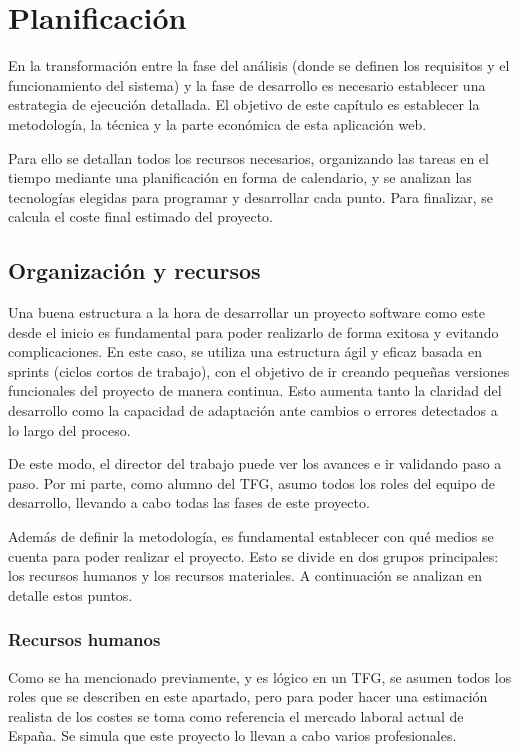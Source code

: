 \chapter{Planificación}

En la transformación entre la fase del análisis (donde se definen los requisitos y el
funcionamiento del sistema) y la fase de desarrollo es necesario establecer una estrategia
de ejecución detallada. El objetivo de este capítulo es establecer la metodología, la técnica
y la parte económica de esta aplicación web.

Para ello se detallan todos los recursos necesarios, organizando las tareas en el tiempo
mediante una planificación en forma de calendario, y se analizan las tecnologías elegidas
para programar y desarrollar cada punto. Para finalizar, se calcula el coste final estimado
del proyecto.

\section{Organización y recursos}

Una buena estructura a la hora de desarrollar un proyecto software como este desde el
inicio es fundamental para poder realizarlo de forma exitosa y evitando complicaciones. En
este caso, se utiliza una estructura ágil y eficaz basada en sprints (ciclos cortos de trabajo),
con el objetivo de ir creando pequeñas versiones funcionales del proyecto de manera
continua. Esto aumenta tanto la claridad del desarrollo como la capacidad de adaptación
ante cambios o errores detectados a lo largo del proceso.

De este modo, el director del trabajo puede ver los avances e ir validando paso a paso. Por
mi parte, como alumno del TFG, asumo todos los roles del equipo de desarrollo, llevando a
cabo todas las fases de este proyecto.

Además de definir la metodología, es fundamental establecer con qué medios se cuenta
para poder realizar el proyecto. Esto se divide en dos grupos principales: los recursos
humanos y los recursos materiales. A continuación se analizan en detalle estos puntos.

\subsection{Recursos humanos}

Como se ha mencionado previamente, y es lógico en un TFG, se asumen todos los roles que
se describen en este apartado, pero para poder hacer una estimación realista de los costes
se toma como referencia el mercado laboral actual de España. Se simula que este proyecto
lo llevan a cabo varios profesionales.


